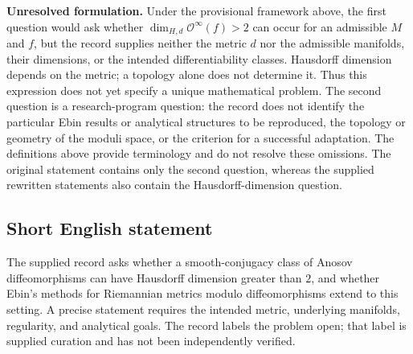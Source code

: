 \documentclass[11pt]{article}
\begin{document}
\textbf{Unresolved formulation.} Under the provisional framework above, the first question would ask whether \(\dim_{H,d}\mathcal O^{\infty}(f)>2\) can occur for an admissible \(M\) and \(f\), but the record supplies neither the metric \(d\) nor the admissible manifolds, their dimensions, or the intended differentiability classes. Hausdorff dimension depends on the metric; a topology alone does not determine it. Thus this expression does not yet specify a unique mathematical problem. The second question is a research-program question: the record does not identify the particular Ebin results or analytical structures to be reproduced, the topology or geometry of the moduli space, or the criterion for a successful adaptation. The definitions above provide terminology and do not resolve these omissions. The original statement contains only the second question, whereas the supplied rewritten statements also contain the Hausdorff-dimension question.
\subsection{Short English statement}
The supplied record asks whether a smooth-conjugacy class of Anosov diffeomorphisms can have Hausdorff dimension greater than \(2\), and whether Ebin's methods for Riemannian metrics modulo diffeomorphisms extend to this setting. A precise statement requires the intended metric, underlying manifolds, regularity, and analytical goals. The record labels the problem open; that label is supplied curation and has not been independently verified.
\end{document}
